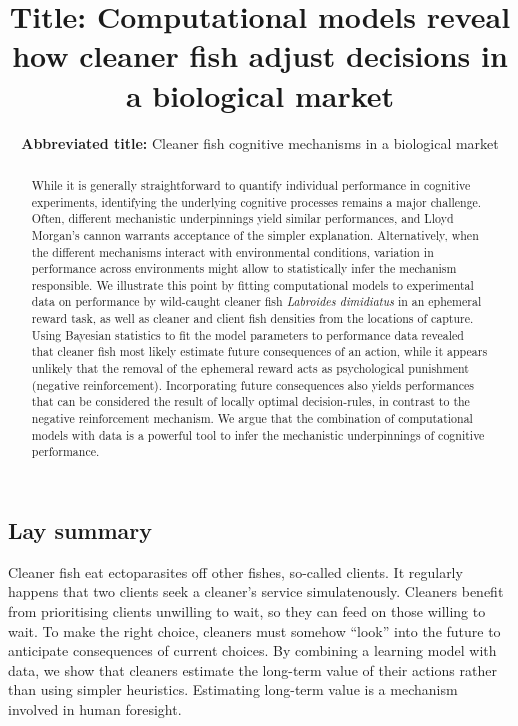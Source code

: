 \documentclass[
  12pt,
]{article}
\title{\large \textbf{Title:} Computational models reveal how cleaner
fish adjust decisions in a biological market}
\subtitle{\normalsize \textbf{Abbreviated title:} Cleaner fish cognitive
mechanisms in a biological market}
\date{}
\begin{document}
\maketitle
\begin{flushleft}
\end{flushleft}
\begin{abstract}
While it is generally straightforward to quantify individual performance
in cognitive experiments, identifying the underlying cognitive processes
remains a major challenge. Often, different mechanistic underpinnings
yield similar performances, and Lloyd Morgan's cannon warrants
acceptance of the simpler explanation. Alternatively, when the different
mechanisms interact with environmental conditions, variation in
performance across environments might allow to statistically infer the
mechanism responsible. We illustrate this point by fitting computational
models to experimental data on performance by wild-caught cleaner fish
\emph{Labroides dimidiatus} in an ephemeral reward task, as well as
cleaner and client fish densities from the locations of capture. Using
Bayesian statistics to fit the model parameters to performance data
revealed that cleaner fish most likely estimate future consequences of
an action, while it appears unlikely that the removal of the ephemeral
reward acts as psychological punishment (negative reinforcement).
Incorporating future consequences also yields performances that can be
considered the result of locally optimal decision-rules, in contrast to
the negative reinforcement mechanism. We argue that the combination of
computational models with data is a powerful tool to infer the
mechanistic underpinnings of cognitive performance.
\end{abstract}
\subsection*{Lay summary}
Cleaner fish eat ectoparasites off other fishes, so-called clients. It
regularly happens that two clients seek a cleaner's service
simulatenously. Cleaners benefit from prioritising clients unwilling to
wait, so they can feed on those willing to wait. To make the right
choice, cleaners must somehow ``look'' into the future to anticipate
consequences of current choices. By combining a learning model with
data, we show that cleaners estimate the long-term value of their
actions rather than using simpler heuristics. Estimating long-term value
is a mechanism involved in human foresight.


\end{document}
